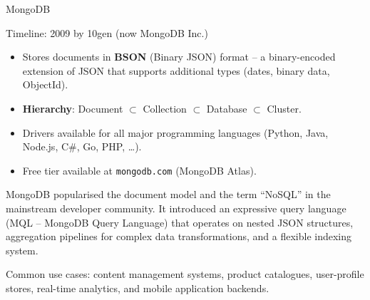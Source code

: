 \begin{frame}{MongoDB}
  \begin{block}{Timeline: 2009 by 10gen (now MongoDB Inc.)}
    \begin{itemize}
      \item Stores documents in \textbf{BSON} (Binary JSON) format --
            a binary-encoded extension of JSON that supports additional types
            (dates, binary data, ObjectId).
      \item \textbf{Hierarchy}: Document $\subset$ Collection $\subset$
            Database $\subset$ Cluster.
      \item Drivers available for all major programming languages
            (Python, Java, Node.js, C\#, Go, PHP, \ldots).
      \item Free tier available at \texttt{mongodb.com} (MongoDB Atlas).
    \end{itemize}
  \end{block}

  MongoDB popularised the document model and the term ``NoSQL'' in the
  mainstream developer community.  It introduced an expressive query language
  (MQL -- MongoDB Query Language) that operates on nested JSON structures,
  aggregation pipelines for complex data transformations, and a flexible
  indexing system.

  \medskip
  Common use cases: content management systems, product catalogues,
  user-profile stores, real-time analytics, and mobile application backends.
\end{frame}

